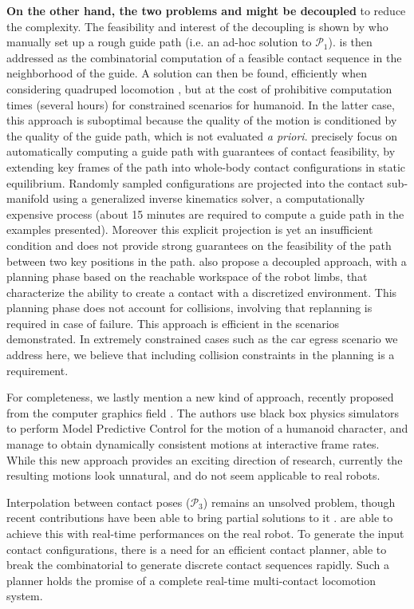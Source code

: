 \textbf{On the other hand, the two problems \Pa and \Pb might be decoupled} to reduce the complexity. The feasibility and interest of the decoupling is shown by \citeauthor{DBLP:conf/iser/EscandeKMG08} who manually set up a rough guide path (i.e. an ad-hoc solution to $\mathcal{P}_1$). \Pb  is then addressed as the combinatorial computation of a feasible contact sequence in the neighborhood of the guide. A solution can then be found, efficiently when considering quadruped locomotion \citep{kalakrishnan2011learning}, but at the cost of prohibitive computation times (several hours) for constrained scenarios for humanoid. In the latter case, this approach is suboptimal because the quality of the motion is conditioned by the quality of the guide path,  which is not evaluated \textit{a priori}. \citeauthor{Bouyarmane2009} precisely focus on automatically computing a guide path with guarantees of contact feasibility, by extending key frames of the path into whole-body contact configurations in static equilibrium. Randomly sampled configurations are projected into the contact sub-manifold using a generalized inverse kinematics solver, a computationally expensive process (about 15 minutes are required to compute a guide path in the examples presented). Moreover this explicit projection is yet an insufficient condition and does not provide strong guarantees on the feasibility of the path between two key positions in the path. \citeauthor{7140082} also propose a decoupled approach, with a planning phase based on the reachable workspace of the robot limbs, that characterize the ability to create a contact with 
a discretized environment. This planning phase does not account for collisions, involving that replanning is required in case of failure. This approach is efficient 
in the scenarios demonstrated. In extremely constrained cases such 
as the car egress scenario we address here, we believe that including collision constraints in the planning is a requirement.

For completeness, we lastly mention a new kind of approach, recently proposed from the computer graphics field \citep{hamalainen_cpbp_2015}. The authors
use black box physics simulators to perform Model Predictive Control for the motion of a humanoid character, and manage to obtain dynamically consistent motions
at interactive frame rates. While this new approach provides an exciting direction of research, currently the resulting motions
look unnatural, and do not seem applicable to real robots.

Interpolation between contact poses ($\mathcal{P}_3$) remains an unsolved problem,
though recent contributions have been able to bring partial solutions to it \citep{Hauser2014, herzog2015trajectory, Park116, Carpentier2016}. \citeauthor{Carpentier2016} are able to achieve this with real-time performances on the real robot.
To generate the input contact configurations, there is a need for an efficient contact planner, able to break the combinatorial to generate discrete contact sequences rapidly. Such a planner holds the promise of a complete real-time multi-contact locomotion system.

